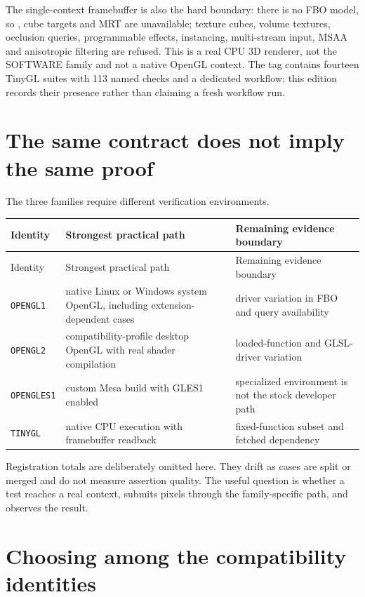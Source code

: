 The single-context framebuffer is also the hard boundary: there is no FBO model, so
, cube targets and MRT are unavailable; texture cubes, volume textures,
occlusion queries, programmable effects, instancing, multi-stream input, MSAA and anisotropic
filtering are refused. This is a real CPU 3D renderer, not the SOFTWARE family and not a native
OpenGL context. The tag contains fourteen TinyGL suites with 113 named checks and a dedicated
workflow; this edition records their presence rather than claiming a fresh workflow run.

\section{The same contract does not imply the same proof}

The three families require different verification environments.

\begin{longtable}{p{}p{}p{}}
\toprule
Identity & Strongest practical path & Remaining evidence boundary \\
\midrule
\endfirsthead
\toprule
Identity & Strongest practical path & Remaining evidence boundary \\
\midrule
\endhead
\texttt{OPENGL1} & native Linux or Windows system OpenGL, including extension-dependent cases & driver variation in FBO and query availability \\
\texttt{OPENGL2} & compatibility-profile desktop OpenGL with real shader compilation & loaded-function and GLSL-driver variation \\
\texttt{OPENGLES1} & custom Mesa build with GLES1 enabled & specialized environment is not the stock developer path \\
\texttt{TINYGL} & native CPU execution with framebuffer readback & fixed-function subset and fetched dependency \\
\bottomrule
\end{longtable}

Registration totals are deliberately omitted here.  They drift as cases are split or merged
and do not measure assertion quality.  The useful question is whether a test reaches a real
context, submits pixels through the family-specific path, and observes the result.

\section{Choosing among the compatibility identities}

